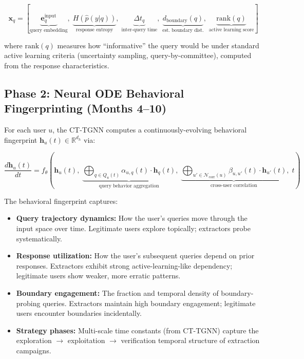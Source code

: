 \documentclass[12pt,a4paper]{article}
\newcommand{\R}{\mathbb{R}}
\begin{document}
\begin{equation}
    \mathbf{x}_q = \left[\underbrace{\mathbf{e}_q^{\text{input}}}_{\text{query embedding}},\; \underbrace{H(\hat{p}(y|q))}_{\text{response entropy}},\; \underbrace{\Delta t_q}_{\text{inter-query time}},\; \underbrace{d_{\text{boundary}}(q)}_{\text{est. boundary dist.}},\; \underbrace{\text{rank}(q)}_{\text{active learning score}}\right]
\end{equation}

where $\text{rank}(q)$ measures how ``informative'' the query would be under standard active learning criteria (uncertainty sampling, query-by-committee), computed from the response characteristics.

\subsection{Phase 2: Neural ODE Behavioral Fingerprinting (Months 4--10)}

For each user $u$, the CT-TGNN computes a continuously-evolving behavioral fingerprint $\mathbf{h}_u(t) \in \R^{d_h}$ via:

\begin{equation}
    \frac{d\mathbf{h}_u(t)}{dt} = f_\theta\left(\mathbf{h}_u(t),\; \underbrace{\bigoplus_{q \in Q_u(t)} \alpha_{u,q}(t) \cdot \mathbf{h}_q(t)}_{\text{query behavior aggregation}},\; \underbrace{\bigoplus_{u' \in \mathcal{N}_{\text{corr}}(u)} \beta_{u,u'}(t) \cdot \mathbf{h}_{u'}(t)}_{\text{cross-user correlation}},\; t\right)
\end{equation}

The behavioral fingerprint captures:

\begin{itemize}
    \item \textbf{Query trajectory dynamics:} How the user's queries move through the input space over time. Legitimate users explore topically; extractors probe systematically.
    
    \item \textbf{Response utilization:} How the user's subsequent queries depend on prior responses. Extractors exhibit strong active-learning-like dependency; legitimate users show weaker, more erratic patterns.
    
    \item \textbf{Boundary engagement:} The fraction and temporal density of boundary-probing queries. Extractors maintain high boundary engagement; legitimate users encounter boundaries incidentally.
    
    \item \textbf{Strategy phases:} Multi-scale time constants (from CT-TGNN) capture the exploration $\to$ exploitation $\to$ verification temporal structure of extraction campaigns.
\end{itemize}
\end{document}
